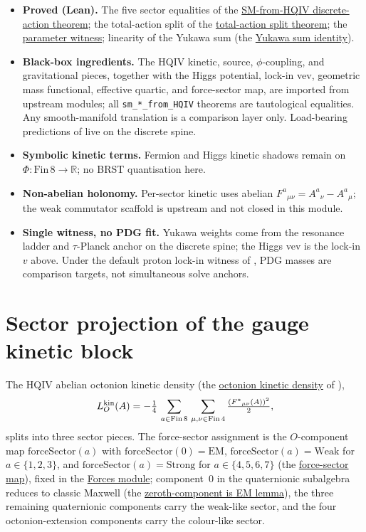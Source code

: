 \documentclass[11pt]{amsart}
\begin{document}
\begin{itemize}[leftmargin=2em]
\item \textbf{Proved (Lean).} The five sector equalities of the
  \hyperref[lean:headline]{SM-from-HQIV discrete-action theorem}; the
  total-action split of the
  \hyperref[lean:total-split]{total-action split theorem}; the
  \hyperref[lean:param-witness]{parameter witness}; linearity of the
  Yukawa sum (the \hyperref[lean:yukawa-sum]{Yukawa sum identity}).
\item \textbf{Black-box ingredients.} The HQIV kinetic, source,
  $\phi$-coupling, and gravitational pieces, together with the Higgs
  potential, lock-in vev, geometric mass functional, effective quartic,
  and force-sector map, are imported from upstream modules; all
  \texttt{sm\_*\_from\_HQIV} theorems are tautological equalities.
  Any smooth-manifold translation is a comparison layer only. Load-bearing
  predictions of \cite{hqiv-oct-action-paper} live on the discrete spine.
\item \textbf{Symbolic kinetic terms.} Fermion and Higgs kinetic shadows
  remain on $\Phi:\mathrm{Fin}\,8\to\mathbb{R}$; no BRST quantisation here.
\item \textbf{Non-abelian holonomy.} Per-sector kinetic uses abelian
  $F^a{}_{\mu\nu}=A^a{}_\nu-A^a{}_\mu$; the weak commutator scaffold is
  upstream and not closed in this module.
\item \textbf{Single witness, no PDG fit.} Yukawa weights come from the
  resonance ladder and $\tau$-Planck anchor on the discrete spine; the Higgs
  vev is the lock-in $v$ above. Under the default proton lock-in witness of
  \cite{hqiv-mass-spectrum-paper,hqiv-kirchhoff-paper}, PDG masses are
  comparison targets, not simultaneous solve anchors.
\end{itemize}

\section{Sector projection of the gauge kinetic block}
\label{sec:gauge}

The HQIV abelian octonion kinetic density (the
\hyperref[lean:LO-kin]{octonion kinetic density} of
\cite{hqiv-oct-action-paper}),
\[
L_O^{\rm kin}(A)
= -\tfrac14\,\sum_{a\in\mathrm{Fin}\,8}\,\sum_{\mu,\nu\in\mathrm{Fin}\,4}
\tfrac{(F^a{}_{\mu\nu}(A))^2}{2},
\]
splits into three sector pieces. The force-sector assignment is the
$O$-component map $\mathrm{forceSector}(a)$ with
$\mathrm{forceSector}(0)=\mathrm{EM}$,
$\mathrm{forceSector}(a)=\mathrm{Weak}$ for $a\in\{1,2,3\}$, and
$\mathrm{forceSector}(a)=\mathrm{Strong}$ for $a\in\{4,5,6,7\}$ (the
\hyperref[lean:O-to-sector]{force-sector map}), fixed in the
\hyperref[lean:forces]{Forces module}; component~$0$ in the quaternionic
subalgebra reduces to classic Maxwell (the
\hyperref[lean:O-zero-EM]{zeroth-component is EM lemma}), the three
remaining quaternionic components carry the weak-like sector, and the four
octonion-extension components carry the colour-like sector.
\end{document}
